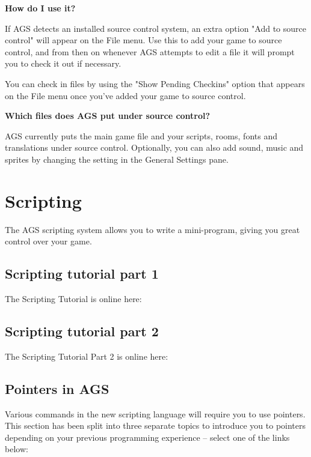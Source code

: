 \bf{How do I use it?}

If AGS detects an installed source control system, an extra option "Add to
source control" will appear on the File menu. Use this to add your game to
source control, and from then on whenever AGS attempts to edit a file it
will prompt you to check it out if necessary.

You can check in files by using the "Show Pending Checkins" option that
appears on the File menu once you've added your game to source control.

\bf{Which files does AGS put under source control?}

AGS currently puts the main game file and your scripts, rooms, fonts and
translations under source control. Optionally, you can also add sound, music
and sprites by changing the setting in the General Settings pane.


\chapter{Scripting}%

The AGS scripting system allows you to write a mini-program, giving you great
control over your game.

\section{Scripting tutorial part 1}%

The Scripting Tutorial is online here:

\section{Scripting tutorial part 2}%

The Scripting Tutorial Part 2 is online here:


\section{Pointers in AGS}\label{Pointers}%

Various commands in the new scripting language will require you to use pointers.
This section has been split into three separate topics to introduce you
to pointers depending on your previous programming experience -- select one of the
links below:

